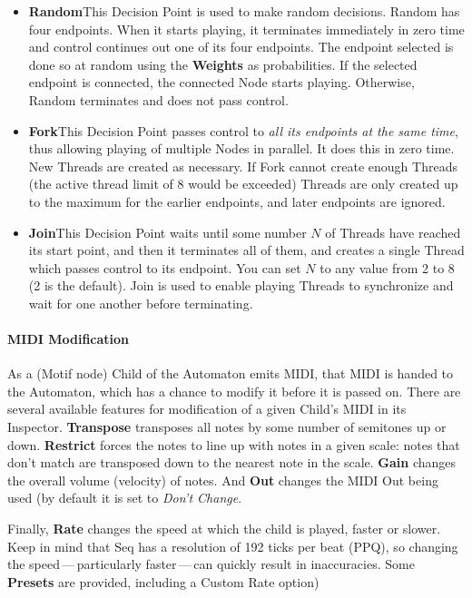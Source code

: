 \documentclass[twoside,10pt]{article}
\begin{document}
\begin{itemize}
\item{\bf Random}\quad This Decision Point is used to make random decisions.  Random has four endpoints.  When it starts playing, it terminates immediately in zero time and control continues out one of its four endpoints. The endpoint selected is done so at random using the {\bf Weights} as probabilities.  If the selected endpoint is connected, the connected Node starts playing.  Otherwise, Random terminates and does not pass control. 

\item{\bf Fork}\quad This Decision Point passes control to {\it all its endpoints at the same time}, thus allowing playing of multiple Nodes in parallel.  It does this in zero time.  New Threads are created as necessary.  If Fork cannot create enough Threads (the active thread limit of 8 would be exceeded) Threads are only created up to the maximum for the earlier endpoints, and later endpoints are ignored.

\item{\bf Join}\quad This Decision Point waits until some number \(N\) of Threads have reached its start point, and then it terminates all of them, and creates a single Thread which passes control to its endpoint.  You can set \(N\) to any value from 2 to 8 (2 is the default).  Join is used to enable playing Threads to synchronize and wait for one another before terminating.  

\end{itemize}

\paragraph{MIDI Modification}

As a (Motif node) Child of the Automaton emits MIDI, that MIDI is handed to the Automaton, which has a chance to modify it before it is passed on.  There are several available features for modification of a given Child's MIDI in its Inspector.  {\bf Transpose} transposes all notes by some number of semitones up or down.  {\bf Restrict} forces the notes to line up with notes in a given scale: notes that don't match are transposed down to the nearest note in the scale.  {\bf Gain} changes the overall volume (velocity) of notes.  And {\bf Out} changes the MIDI Out being used (by default it is set to {\it Don't Change}.

Finally, {\bf Rate} changes the speed at which the child is played, faster or slower.  Keep in mind that Seq has a resolution of 192 ticks per beat (PPQ), so changing the speed\,---\,particularly faster\,---\,can quickly result in inaccuracies.    Some {\bf Presets} are provided, including a Custom Rate option)
\end{document}

